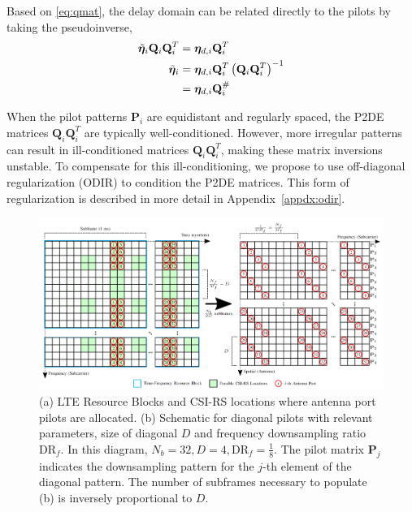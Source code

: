 Based on \ref{eq:qmat}, the delay domain can be related directly to the pilots by taking the pseudoinverse,
\begin{align}
	\tilde{\boldsymbol{\eta}}_{i}\mathbf{Q}_i\mathbf{Q}_i^T &= \boldsymbol{\eta}_{d,i}\mathbf{Q}_i^T \nonumber \\
	\tilde{\boldsymbol{\eta}}_{i} &= \boldsymbol{\eta}_{d,i}\mathbf{Q}_i^T\left(\mathbf{Q}_i\mathbf{Q}_i^T\right)^{-1} \nonumber \\
	&= \boldsymbol{\eta}_{d,i}\mathbf{Q}_i^{\#} \label{eq:p2d}
\end{align}


When the pilot patterns $\mathbf{P}_i$ are equidistant and regularly spaced, the P2DE matrices $\mathbf{Q}_i\mathbf{Q}_i^T$ are typically well-conditioned. However, more irregular patterns can result in ill-conditioned matrices $\mathbf{Q}_i\mathbf{Q}_i^T$, making these matrix inversions unstable. To compensate for this ill-conditioning, we propose to use off-diagonal regularization (ODIR) to condition the P2DE matrices. This form of regularization is described in more detail in Appendix~\ref{appdx:odir}. 

\begin{figure}[!hbtp]
    \centering
    \includegraphics[width=\linewidth]{images/01_p2d_pilots_diag_with_resource_grid.png}
    \caption{(a) LTE Resource Blocks and CSI-RS locations where antenna port pilots are allocated. (b) Schematic for diagonal pilots with relevant parameters, size of diagonal $D$ and frequency downsampling ratio $\text{DR}_f$. In this diagram, $N_b=32, D=4, \text{DR}_f=\frac 18$. The pilot matrix $\mathbf{P}_j$ indicates the downsampling pattern for the $j$-th element of the diagonal pattern. The number of subframes necessary to populate (b) is inversely proportional to $D$.}
    \label{fig:p2d_diag}
\end{figure}


